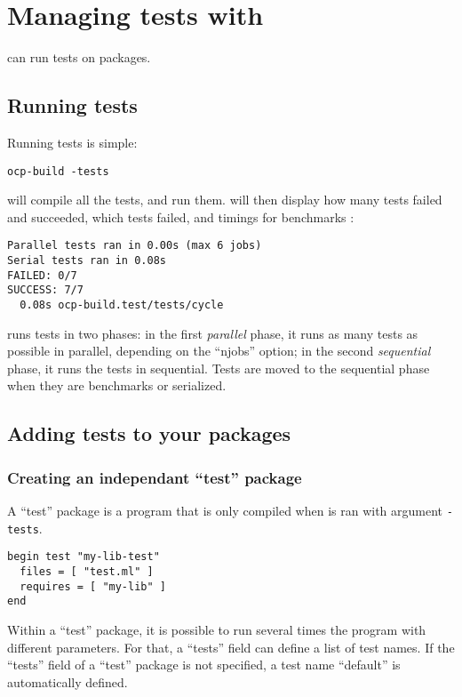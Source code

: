 \chapter{Managing tests with \ocpbuild{}}

\ocpbuild{} can run tests on packages.

\section{Running tests}

Running tests is simple:
\begin{verbatim}
ocp-build -tests
\end{verbatim}

\ocpbuild{} will compile all the tests, and run them. \ocpbuild{} will
then display how many tests failed and succeeded, which tests failed,
and timings for benchmarks :

\begin{verbatim}
Parallel tests ran in 0.00s (max 6 jobs)
Serial tests ran in 0.08s
FAILED: 0/7
SUCCESS: 7/7
  0.08s	ocp-build.test/tests/cycle
\end{verbatim}

\ocpbuild{} runs tests in two phases: in the first \emph{parallel}
phase, it runs as many tests as possible in parallel, depending on the
``njobs'' option; in the second \emph{sequential} phase, it runs the
tests in sequential. Tests are moved to the sequential phase when they
are benchmarks or serialized.

\section{Adding tests to your packages}

\subsection{Creating an independant ``test'' package}

A ``test'' package is a program that is only compiled when 
\ocpbuild{} is ran with argument \verb+-tests+.

\begin{verbatim}
begin test "my-lib-test"
  files = [ "test.ml" ]
  requires = [ "my-lib" ]
end
\end{verbatim}

Within a ``test'' package, it is possible to run several times the
program with different parameters. For that, a ``tests'' field can
define a list of test names. If the ``tests'' field of a ``test''
package is not specified, a test name ``default'' is automatically
defined.

